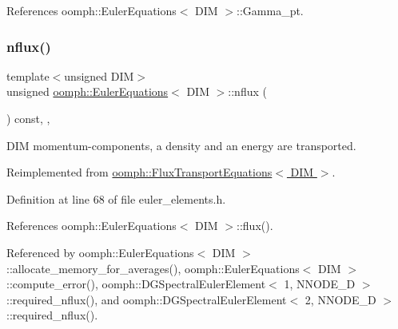 References oomph\+::\+Euler\+Equations$<$ D\+I\+M $>$\+::\+Gamma\+\_\+pt.

\mbox{\label{classoomph_1_1EulerEquations_a6bf35d53c8c306df8865192ef85cc08f}} 
\subsubsection{\texorpdfstring{nflux()}{nflux()}}
{\footnotesize\ttfamily template$<$unsigned D\+IM$>$ \\
unsigned \hyperlink{classoomph_1_1EulerEquations}{oomph\+::\+Euler\+Equations}$<$ D\+IM $>$\+::nflux (\begin{DoxyParamCaption}{ }\end{DoxyParamCaption}) const\hspace{0.3cm}{\ttfamily [inline]}, {\ttfamily [protected]}, {\ttfamily [virtual]}}



D\+IM momentum-\/components, a density and an energy are transported. 



Reimplemented from \hyperlink{classoomph_1_1FluxTransportEquations_ae77531d3bdd9241f450fdb360e7a5cc9}{oomph\+::\+Flux\+Transport\+Equations$<$ D\+I\+M $>$}.



Definition at line 68 of file euler\+\_\+elements.\+h.



References oomph\+::\+Euler\+Equations$<$ D\+I\+M $>$\+::flux().



Referenced by oomph\+::\+Euler\+Equations$<$ D\+I\+M $>$\+::allocate\+\_\+memory\+\_\+for\+\_\+averages(), oomph\+::\+Euler\+Equations$<$ D\+I\+M $>$\+::compute\+\_\+error(), oomph\+::\+D\+G\+Spectral\+Euler\+Element$<$ 1, N\+N\+O\+D\+E\+\_\+D $>$\+::required\+\_\+nflux(), and oomph\+::\+D\+G\+Spectral\+Euler\+Element$<$ 2, N\+N\+O\+D\+E\+\_\+D $>$\+::required\+\_\+nflux().

\mbox{\label{classoomph_1_1EulerEquations_a4478d473edbda3529602c75f70cafe30}} 
